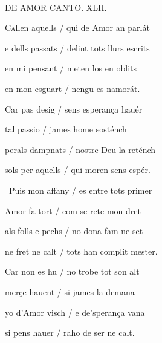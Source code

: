 \documentclass[12pt]{article}
\renewcommand{\espaiAbansEtiquetaPoema}{\vspace{0ex}}
\begin{document}
\begin{estrofa}

\espaiAbansEtiquetaPoema

\\

\begin{rubrica}

DE AMOR CANTO. XLII.

\end{rubrica}

\end{estrofa}


\begin{estrofa}

 C\textsc{a}llen aquells / qui de Amor an parl\'{a}t

 e dells passats / delint tots llurs escrits

 en mi pensant / meten los en oblits

 en mon esguart / nengu es namor\'{a}t.

 Car pas desig / sens esperan\c{c}a hau\'{e}r

 tal passio / james home sost\'{e}nch

 perals dampnats / nostre Deu la ret\'{e}nch

 sols per aquells / qui moren sens esp\'{e}r.

\end{estrofa}



\begin{estrofa}

 \textparagraph\  Puis mon affany / es entre tots primer

 Amor fa tort / com se rete mon dret

 als folls e pechs / no dona fam ne set

 ne fret ne calt / tots han complit mester.

 Car non es hu / no trobe tot son alt

 mer\c{c}e hauent / si james la demana

 yo d'Amor visch / e de'speran\c{c}a vana

 si pens hauer / raho de ser ne calt.

\end{estrofa}
\end{document}
